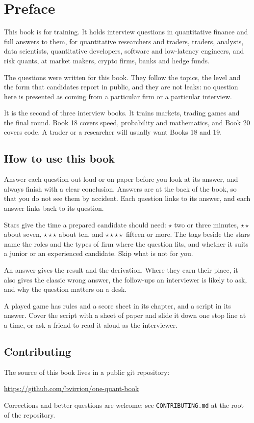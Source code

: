 \chapter{Preface}

This book is for training. It holds interview questions in quantitative finance and full answers to them, for
quantitative researchers and traders, traders, analysts, data scientists, quantitative developers, software and
low-latency engineers, and risk quants, at market makers, crypto firms, banks and hedge funds.

The questions were written for this book. They follow the topics, the level and the form that candidates report in
public, and they are not leaks: no question here is presented as coming from a particular firm or a particular
interview.

It is the second of three interview books. It trains markets, trading games and the final round. Book 18 covers
speed, probability and mathematics, and Book 20 covers code. A trader or a researcher will usually want Books 18 and 19.

\section*{How to use this book}

Answer each question out loud or on paper before you look at its answer, and always finish with a clear conclusion.
Answers are at the back of the book, so that you do not see them by accident. Each question links to its answer, and
each answer links back to its question.

Stars give the time a prepared candidate should need: $\star$ two or three minutes, $\star\star$ about seven,
$\star\star\star$ about ten, and $\star\star\star\star$ fifteen or more. The tags beside the stars name the roles and
the types of firm where the question fits, and whether it suits a junior or an experienced candidate. Skip what is not
for you.

An answer gives the result and the derivation. Where they earn their place, it also gives the classic wrong answer, the
follow-ups an interviewer is likely to ask, and why the question matters on a desk.

A played game has rules and a score sheet in its chapter, and a script in its answer. Cover the script with a sheet of
paper and slide it down one stop line at a time, or ask a friend to read it aloud as the interviewer.


\section*{Contributing}

The source of this book lives in a public git repository:
\begin{center}
\url{https://github.com/bvirrion/one-quant-book}
\end{center}
Corrections and better questions are welcome; see \texttt{CONTRIBUTING.md} at the root of the repository.
